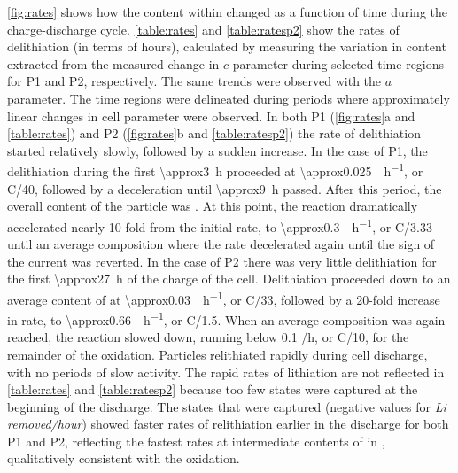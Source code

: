 \documentclass{article}
\begin{document}
\ref{fig:rates} shows how the  content within \nca{} changed as
a function of time during the charge-discharge
cycle. \ref{table:rates} and \ref{table:ratesp2} show the rates of
delithiation (in terms of hours), calculated by measuring the
variation in  content extracted from the measured change in $c$
parameter during selected time regions for P1 and P2,
respectively. The same trends were observed with the $a$
parameter. The time regions were delineated during periods where
approximately linear changes in cell parameter were observed. In both
P1 (\ref{fig:rates}a and \ref{table:rates}) and P2 (\ref{fig:rates}b
and \ref{table:ratesp2}) the rate of delithiation started relatively
slowly, followed by a sudden increase. In the case of P1, the
delithiation during the first \SI{\approx3}{\hour} proceeded at
\SI{\approx0.025}{\per\hour}, or C/40, followed by a
deceleration until \SI{\approx9}{\hour} passed. After this period, the
overall content of the particle was
. At this point, the
reaction dramatically accelerated nearly 10-fold from the initial
rate, to \SI{\approx0.3}{\per\hour}, or C/3.33 until an average
composition  where the rate decelerated again until the sign
of the current was reverted. In the case of P2 there was very little
delithiation for the first \SI{\approx27}{\hour} of the charge of the
cell. Delithiation proceeded down to an average content of 
at \SI{\approx0.03}{\per\hour}, or C/33, followed by a 20-fold
increase in rate, to \SI{\approx0.66}{\per\hour}, or
C/1.5. When an average composition  was again reached, the
reaction slowed down, running below 0.1 /h, or C/10, for the
remainder of the oxidation. Particles relithiated rapidly during cell
discharge, with no periods of slow activity. The rapid rates of
lithiation are not reflected in \ref{table:rates} and
\ref{table:ratesp2} because too few states were captured at the
beginning of the discharge. The states that were captured (negative
values for \emph{Li removed/hour}) showed faster rates of relithiation
earlier in the discharge for both P1 and P2, reflecting the fastest
rates at intermediate contents of  in , qualitatively
consistent with the oxidation.
\end{document}
